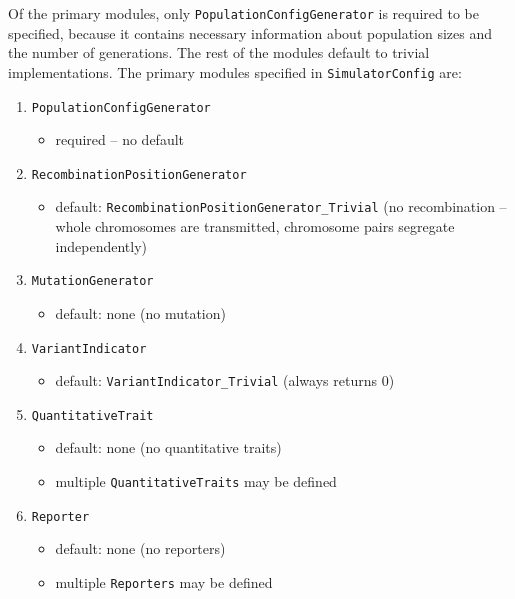 \documentclass{article}
\begin{document}
Of the primary modules, only \texttt{PopulationConfigGenerator} is required
to be specified, because it contains necessary information about population
sizes and the number of generations.  The rest of the modules default to
trivial implementations. 
The primary modules specified in \texttt{SimulatorConfig} are:
\begin{enumerate}
    \item \texttt{PopulationConfigGenerator} 
        \begin{itemize}
            \item required -- no default
        \end{itemize}
    \item \texttt{RecombinationPositionGenerator} 
        \begin{itemize}
            \item default: \texttt{Recombination\-Position\-Generator\-\_Trivial} 
            (no recombination -- whole chromosomes are transmitted, chromosome pairs
            segregate independently)
        \end{itemize}
    \item \texttt{MutationGenerator}
        \begin{itemize}
            \item default: none (no mutation)
        \end{itemize}
    \item \texttt{VariantIndicator}
        \begin{itemize}
            \item default: \texttt{VariantIndicator\_Trivial} (always returns 0)
        \end{itemize}
    \item \texttt{QuantitativeTrait}
        \begin{itemize}
            \item default: none (no quantitative traits)
            \item multiple \texttt{QuantitativeTraits} may be defined
        \end{itemize}
    \item \texttt{Reporter}
        \begin{itemize}
            \item default: none (no reporters)
            \item multiple \texttt{Reporters} may be defined
        \end{itemize}
\end{enumerate}
\end{document}
